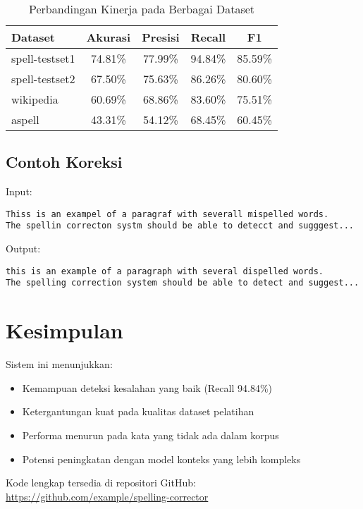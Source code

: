 \documentclass{article}
\begin{document}
\begin{table}[h]
\centering
\caption{Perbandingan Kinerja pada Berbagai Dataset}
\begin{tabular}{|l|c|c|c|c|}
\hline
\textbf{Dataset} & \textbf{Akurasi} & \textbf{Presisi} & \textbf{Recall} & \textbf{F1} \\
\hline
spell-testset1 & 74.81\% & 77.99\% & 94.84\% & 85.59\% \\
spell-testset2 & 67.50\% & 75.63\% & 86.26\% & 80.60\% \\
wikipedia & 60.69\% & 68.86\% & 83.60\% & 75.51\% \\
aspell & 43.31\% & 54.12\% & 68.45\% & 60.45\% \\
\hline
\end{tabular}
\end{table}

\subsection{Contoh Koreksi}
Input:
\begin{verbatim}
Thiss is an exampel of a paragraf with severall mispelled words.
The spellin correcton systm should be able to detecct and sugggest...
\end{verbatim}

Output:
\begin{verbatim}
this is an example of a paragraph with several dispelled words.
The spelling correction system should be able to detect and suggest...
\end{verbatim}

\section{Kesimpulan}
Sistem ini menunjukkan:
\begin{itemize}
    \item Kemampuan deteksi kesalahan yang baik (Recall 94.84\%)
    \item Ketergantungan kuat pada kualitas dataset pelatihan
    \item Performa menurun pada kata yang tidak ada dalam korpus
    \item Potensi peningkatan dengan model konteks yang lebih kompleks
\end{itemize}

Kode lengkap tersedia di repositori GitHub: \url{https://github.com/example/spelling-corrector}
\end{document}

